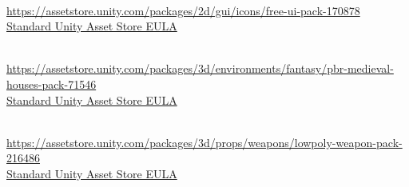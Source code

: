 \begin{description}[]
\item[Free Ui Pack] \hfill \\ \url{https://assetstore.unity.com/packages/2d/gui/icons/free-ui-pack-170878} \\
  \href{https://unity.com/legal/as-terms}{Standard Unity Asset Store EULA}

\item[PBR medieval houses pack] \hfill \\ \url{https://assetstore.unity.com/packages/3d/environments/fantasy/pbr-medieval-houses-pack-71546} \\
  \href{https://unity.com/legal/as-terms}{Standard Unity Asset Store EULA}

\item[LOWPOLY - Weapon Pack] \hfill \\ \url{https://assetstore.unity.com/packages/3d/props/weapons/lowpoly-weapon-pack-216486} \\
  \href{https://unity.com/legal/as-terms}{Standard Unity Asset Store EULA}
\end{description}
